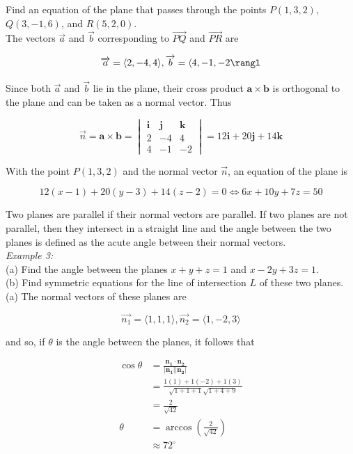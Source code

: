         \textit{} Find an equation of the plane that passes through the points $P(1,3,2)$,$Q(3,-1,6)$, and $R(5,2,0)$. \\
        The vectors $\vec{a}$ and $\vec{b}$ corresponding to $\vec{PQ}$ and $\vec{PR}$ are

        \[
            \vec{a} = \langle 2,-4,4\rangle, \vec{b} = \langle 4, -1, -2\rangl
        \]

        Since both $\vec{a}$ and $\vec{b}$ lie in the plane, their cross product $\mathbf{a\times b}$ is orthogonal to the plane and can be taken as a normal vector. Thus

        \[
            \vec{n} = \mathbf{a\times b} =
            \begin{vmatrix}
                \mathbf{i}  & \mathbf{j}    & \mathbf{k} \\
                2           & -4            & 4 \\
                4           & -1            & -2
            \end{vmatrix}
            = 12\mathbf{i} + 20\mathbf{j} + 14\mathbf{k}
        \]

        With the point $P(1,3,2)$ and the normal vector $\vec{n}$, an equation of the plane is

        \[
            12(x-1) + 20(y-3) + 14(z-2) = 0 \iff 6x + 10y + 7z = 50
        \]

        Two planes are parallel if their normal vectors are parallel. If two planes are not parallel, then they intersect in a straight line and the angle between the two planes is defined as the acute angle between
        their normal vectors. \\

        \color{blue} \textit{Example 3:} \\
        (a) Find the angle between the planes $x + y + z = 1$ and $x - 2y + 3z = 1$. \\
        (b) Find symmetric equations for the line of intersection $L$ of these two planes. \color{black} \\

        (a) The normal vectors of these planes are

        \[
            \vec{n_1} = \langle 1,1,1\rangle, \vec{n_2} = \langle 1,-2,3\rangle
        \]

        and so, if $\theta$ is the angle between the planes, it follows that

        \begin{align*}
            \cos{\theta}    &= \mathbf{\frac{n_1\cdot n_2}{|n_1||n_2|}} \\
                            &= \frac{1(1)+1(-2) + 1(3)}{\sqrt{1+1+1}\sqrt{1+4+9}} \\
                            &= \frac{2}{\sqrt{42}} \\
            \theta          &= \arccos{\left(\frac{2}{\sqrt{42}}\right)} \\
                            &\approx 72^{\circ}
        \end{align*}

